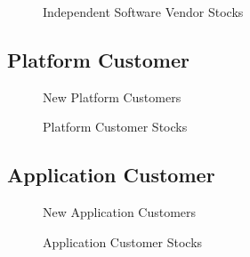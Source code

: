 	\begin{figure}[htb]
		\centering
		
		\caption{Independent Software Vendor Stocks}
	\end{figure}

	\newpage
	\subsection{Platform Customer}\label{ch:app05:cs:pc}
	
	\begin{figure}[htb]
		\centering
		
		\caption{New Platform Customers}
	\end{figure}

	\begin{figure}[htb]
		\centering
		
		\caption{Platform Customer Stocks}
	\end{figure}

	\newpage
	\subsection{Application Customer}\label{ch:app05:cs:ac}
	
	\begin{figure}[htb]
		\centering
		
		\caption{New Application Customers}
	\end{figure}

	\begin{figure}[htb]
		\centering
		
		\caption{Application Customer Stocks}
	\end{figure}